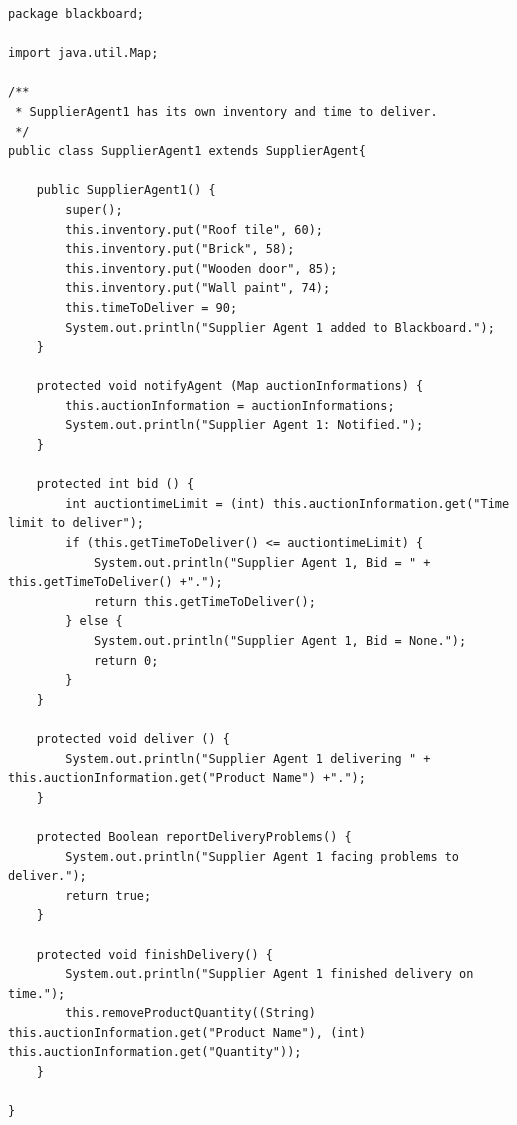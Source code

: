 \begin{lstlisting}
package blackboard;

import java.util.Map;

/**
 * SupplierAgent1 has its own inventory and time to deliver.
 */
public class SupplierAgent1 extends SupplierAgent{
	
	public SupplierAgent1() {
		super();
		this.inventory.put("Roof tile", 60);
		this.inventory.put("Brick", 58);
		this.inventory.put("Wooden door", 85);
		this.inventory.put("Wall paint", 74);
		this.timeToDeliver = 90;
		System.out.println("Supplier Agent 1 added to Blackboard.");
	}
	
	protected void notifyAgent (Map auctionInformations) {
		this.auctionInformation = auctionInformations;
		System.out.println("Supplier Agent 1: Notified.");
	}
	
	protected int bid () {
		int auctiontimeLimit = (int) this.auctionInformation.get("Time limit to deliver");
		if (this.getTimeToDeliver() <= auctiontimeLimit) {
			System.out.println("Supplier Agent 1, Bid = " + this.getTimeToDeliver() +".");
			return this.getTimeToDeliver();
		} else {
			System.out.println("Supplier Agent 1, Bid = None.");
			return 0;
		}
	}
	
	protected void deliver () {
		System.out.println("Supplier Agent 1 delivering " + this.auctionInformation.get("Product Name") +".");
	}

	protected Boolean reportDeliveryProblems() {
		System.out.println("Supplier Agent 1 facing problems to deliver.");
		return true;
	}

	protected void finishDelivery() {
		System.out.println("Supplier Agent 1 finished delivery on time.");
		this.removeProductQuantity((String) this.auctionInformation.get("Product Name"), (int) this.auctionInformation.get("Quantity"));
	}
	
}
\end{lstlisting}

